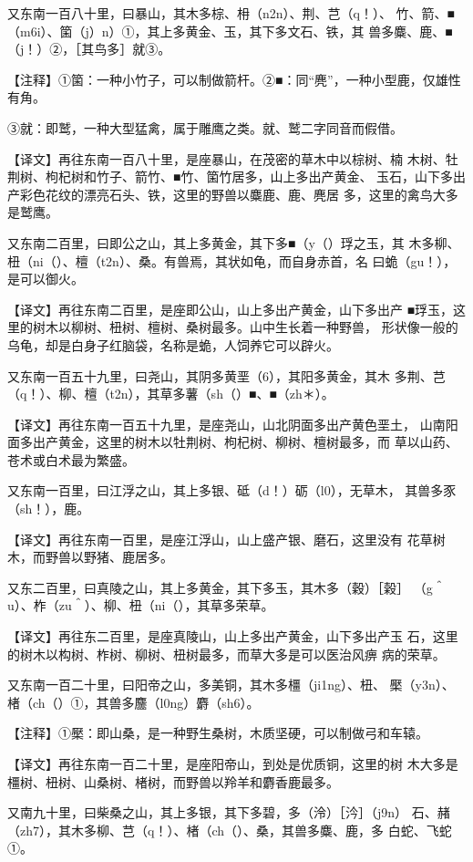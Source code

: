 \documentclass[a4paper,12pt,UTF8,twoside]{ctexbook}
\begin{document}
又东南一百八十里，曰暴山，其木多棕、枏（n2n）、荆、芑（q！）、 竹、箭、■（m6i）、箘（j）n）①，其上多黄金、玉，其下多文石、铁，其 兽多麋、鹿、■（j！）②，［其鸟多］就③。

【注释】①箘：一种小竹子，可以制做箭杆。②■：同“麂”，一种小型鹿，仅雄性有角。

③就：即鹫，一种大型猛禽，属于雕鹰之类。就、鹫二字同音而假借。

【译文】再往东南一百八十里，是座暴山，在茂密的草木中以棕树、楠 木树、牡荆树、枸杞树和竹子、箭竹、■竹、箘竹居多，山上多出产黄金、 玉石，山下多出产彩色花纹的漂亮石头、铁，这里的野兽以麋鹿、鹿、麂居 多，这里的禽鸟大多是鹫鹰。

又东南二百里，曰即公之山，其上多黄金，其下多■（y（）琈之玉，其 木多柳、杻（ni（）、檀（t2n）、桑。有兽焉，其状如龟，而自身赤首，名 曰蛫（gu！），是可以御火。

【译文】再往东南二百里，是座即公山，山上多出产黄金，山下多出产 ■琈玉，这里的树木以柳树、杻树、檀树、桑树最多。山中生长着一种野兽， 形状像一般的乌龟，却是白身子红脑袋，名称是蛫，人饲养它可以辟火。

又东南一百五十九里，曰尧山，其阴多黄垩（6），其阳多黄金，其木 多荆、芑（q！）、柳、檀（t2n），其草多薯（sh（）■、■（zh＊）。

【译文】再往东南一百五十九里，是座尧山，山北阴面多出产黄色垩土， 山南阳面多出产黄金，这里的树木以牡荆树、枸杞树、柳树、檀树最多，而 草以山药、苍术或白术最为繁盛。

又东南一百里，曰江浮之山，其上多银、砥（d！）砺（l0），无草木， 其兽多豕（sh！），鹿。

【译文】再往东南一百里，是座江浮山，山上盛产银、磨石，这里没有 花草树木，而野兽以野猪、鹿居多。

又东二百里，曰真陵之山，其上多黄金，其下多玉，其木多（穀）［榖］ （g＾u）、柞（zu＾）、柳、杻（ni（），其草多荣草。

【译文】再往东二百里，是座真陵山，山上多出产黄金，山下多出产玉 石，这里的树木以构树、柞树、柳树、杻树最多，而草大多是可以医治风痹 病的荣草。

又东南一百二十里，曰阳帝之山，多美铜，其木多橿（ji1ng）、杻、 檿（y3n）、楮（ch（）①，其兽多麢（l0ng）麝（sh6）。

【注释】①檿：即山桑，是一种野生桑树，木质坚硬，可以制做弓和车辕。

【译文】再往东南一百二十里，是座阳帝山，到处是优质铜，这里的树 木大多是橿树、杻树、山桑树、楮树，而野兽以羚羊和麝香鹿最多。

又南九十里，曰柴桑之山，其上多银，其下多碧，多（泠）［汵］（j9n） 石、赭（zh7），其木多柳、芑（q！）、楮（ch（）、桑，其兽多麋、鹿，多 白蛇、飞蛇①。
\end{document}
